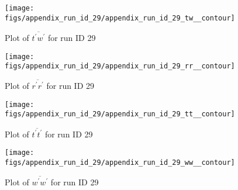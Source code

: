 \begin{figure}[H]
\centering
\texttt{[image: figs/appendix\_run\_id\_29/appendix\_run\_id\_29\_tw\_\_contour]}
\caption{Plot of $\overline{t^\prime w^\prime}$ for run ID 29}
\label{fig:appendix_run_id_29_tw__contour}
\end{figure}


\begin{figure}[H]
\centering
\texttt{[image: figs/appendix\_run\_id\_29/appendix\_run\_id\_29\_rr\_\_contour]}
\caption{Plot of $\overline{r^\prime r^\prime}$ for run ID 29}
\label{fig:appendix_run_id_29_rr__contour}
\end{figure}


\begin{figure}[H]
\centering
\texttt{[image: figs/appendix\_run\_id\_29/appendix\_run\_id\_29\_tt\_\_contour]}
\caption{Plot of $\overline{t^\prime t^\prime}$ for run ID 29}
\label{fig:appendix_run_id_29_tt__contour}
\end{figure}


\begin{figure}[H]
\centering
\texttt{[image: figs/appendix\_run\_id\_29/appendix\_run\_id\_29\_ww\_\_contour]}
\caption{Plot of $\overline{w^\prime w^\prime}$ for run ID 29}
\label{fig:appendix_run_id_29_ww__contour}
\end{figure}


